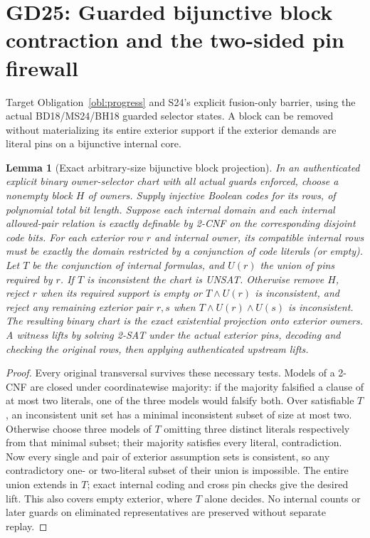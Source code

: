 \documentclass[11pt]{article}
\newtheorem{lemma}[theorem]{Lemma}
\begin{document}
\section{GD25: Guarded bijunctive block contraction and the two-sided pin firewall}\label{sec:gd25}
Target Obligation~\ref{obl:progress} and S24's explicit fusion-only barrier, using the actual BD18/MS24/BH18 guarded selector states. A block can be removed without materializing its entire exterior support if the exterior demands are literal pins on a bijunctive internal core.
\begin{lemma}[Exact arbitrary-size bijunctive block projection]\label{lem:gd25-block}
In an authenticated explicit binary owner-selector chart with all actual guards enforced, choose a nonempty block $H$ of owners. Supply injective Boolean codes for its rows, of polynomial total bit length. Suppose each internal domain and each internal allowed-pair relation is exactly definable by 2-CNF on the corresponding disjoint code bits. For each exterior row $r$ and internal owner, its compatible internal rows must be exactly the domain restricted by a conjunction of code literals (or empty). Let $T$ be the conjunction of internal formulas, and $U(r)$ the union of pins required by $r$. If $T$ is inconsistent the chart is UNSAT. Otherwise remove $H$, reject $r$ when its required support is empty or $T\land U(r)$ is inconsistent, and reject any remaining exterior pair $r,s$ when $T\land U(r)\land U(s)$ is inconsistent. The resulting binary chart is the exact existential projection onto exterior owners. A witness lifts by solving 2-SAT under the actual exterior pins, decoding and checking the original rows, then applying authenticated upstream lifts.
\end{lemma}
\begin{proof}
Every original transversal survives these necessary tests. Models of a 2-CNF are closed under coordinatewise majority: if the majority falsified a clause of at most two literals, one of the three models would falsify both. Over satisfiable $T$, an inconsistent unit set has a minimal inconsistent subset of size at most two. Otherwise choose three models of $T$ omitting three distinct literals respectively from that minimal subset; their majority satisfies every literal, contradiction. Now every single and pair of exterior assumption sets is consistent, so any contradictory one- or two-literal subset of their union is impossible. The entire union extends in $T$; exact internal coding and cross pin checks give the desired lift. This also covers empty exterior, where $T$ alone decides. No internal counts or later guards on eliminated representatives are preserved without separate replay.
\end{proof}
\end{document}

